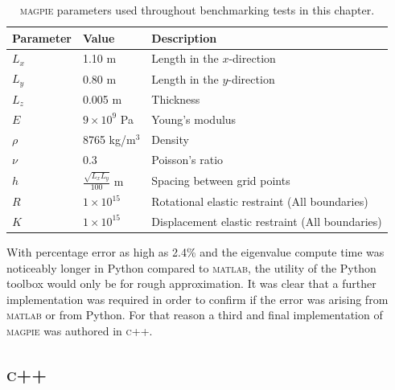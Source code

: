 \begin{table}
	\centering
	\begin{tabular}{lll}
		\hline
		\textbf{Parameter} & \textbf{Value}                 & \textbf{Description}                            \\ \hline
		$L_x$              & 1.10 m                         & Length in the $x$-direction                     \\ 
		$L_y$              & 0.80 m                         & Length in the $y$-direction                     \\ 
		$L_z$              & 0.005 m                        & Thickness                                       \\ 
		$E$                & $9\times 10^{9}$ Pa            & Young's modulus                                 \\ 
		$\rho$             & 8765 kg/m$^3$                  & Density                                         \\ 
		$\nu$              & 0.3                            & Poisson's ratio                                 \\ 
		$h$                & $\frac{\sqrt{L_x L_y}}{100}$ m & Spacing between grid points                     \\ 
		$R$                & $1\times 10^{15}$              & Rotational elastic restraint  (All boundaries)  \\ 
		$K$                & $1\times 10^{15}$              & Displacement elastic restraint (All boundaries) \\ \hline
		
	\end{tabular}
    \caption{\textsc{magpie} parameters used throughout benchmarking tests in this chapter.}
	\label{tab:parameters}
\end{table}

With percentage error as high as 2.4\% and the eigenvalue compute time was noticeably longer in Python compared to \textsc{matlab}, the utility of the Python toolbox would only be for rough approximation. It was clear that a further implementation was required in order to confirm if the error was arising from \textsc{matlab} or from Python. For that reason a third and final implementation of \textsc{magpie} was authored in \textsc{c++}.

\subsection{\textsc{c++}}

